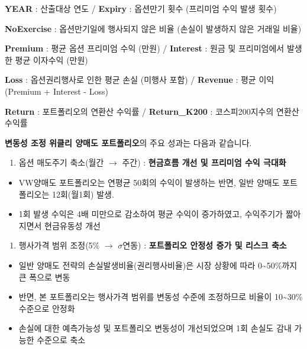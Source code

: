 \documentclass[
  a4paper,
  DIV=11,
  numbers=noendperiod]{scrreprt}
\providecommand{\tightlist}{%
  \setlength{\itemsep}{0pt}\setlength{\parskip}{0pt}}\usepackage{longtable,booktabs,array}
\begin{document}
\begin{tcolorbox}[enhanced jigsaw, breakable, colframe=quarto-callout-color-frame, bottomrule=.15mm, arc=.35mm, opacityback=0, leftrule=.75mm, left=2mm, toprule=.15mm, rightrule=.15mm, colback=white]

\textbf{YEAR} : 산출대상 연도 / \textbf{Expiry} : 옵션만기 횟수
(프리미엄 수익 발생 횟수)

\textbf{NoExercise} : 옵션만기일에 행사되지 않은 비율 (손실이 발생하지
않은 거래일 비율)

\textbf{Premium} : 평균 옵션 프리미엄 수익 (만원) / \textbf{Interest} :
원금 및 프리미엄에서 발생한 평균 이자수익 (만원)

\textbf{Loss} : 옵션권리행사로 인한 평균 손실 (미행사 포함) /
\textbf{Revenue} : 평균 이익 (Premium + Interest - Loss)

\textbf{Return} : 포트폴리오의 연환산 수익률 / \textbf{Return\_K200} :
코스피200지수의 연환산 수익률

\end{tcolorbox}

\textbf{변동성 조정 위클리 양매도 포트폴리오}의 주요 성과는 다음과
같습니다.

\begin{enumerate}
\def\labelenumi{\arabic{enumi}.}
\tightlist
\item
  옵션 매도주기 축소(월간 \(\rightarrow\) 주간) : \textbf{현금흐름 개선
  및 프리미엄 수익 극대화}
\end{enumerate}

\begin{itemize}
\tightlist
\item
  VW양매도 포트폴리오는 연평균 50회의 수익이 발생하는 반면, 일반 양매도
  포트폴리오는 12회(월1회) 발생.
\item
  1회 발생 수익은 4배 미만으로 감소하여 평균 수익이 증가하였고,
  수익주기가 짧아지면서 현금유동성 개선
\end{itemize}

\begin{enumerate}
\def\labelenumi{\arabic{enumi}.}
\setcounter{enumi}{1}
\tightlist
\item
  행사가격 범위 조정(5\% \(\rightarrow\) \(\sigma\)연동) :
  \textbf{포트폴리오 안정성 증가 및 리스크 축소}
\end{enumerate}

\begin{itemize}
\tightlist
\item
  일반 양매도 전략의 손실발생비율(권리행사비율)은 시장 상황에 따라
  0\textasciitilde50\%까지 큰 폭으로 변동
\item
  반면, 본 포트폴리오는 행사가격 범위를 변동성 수준에 조정하므로 비율이
  10\textasciitilde30\%수준으로 안정화
\item
  손실에 대한 예측가능성 및 포트폴리오 변동성이 개선되었으며 1회 손실도
  감내 가능한 수준으로 축소
\end{itemize}
\end{document}
